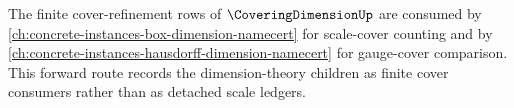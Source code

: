 The finite cover-refinement rows of $\CoveringDimensionUp$ are consumed by
\autoref{ch:concrete-instances-box-dimension-namecert} for scale-cover
counting and by \autoref{ch:concrete-instances-hausdorff-dimension-namecert}
for gauge-cover comparison. This forward route records the dimension-theory
children as finite cover consumers rather than as detached scale ledgers.
